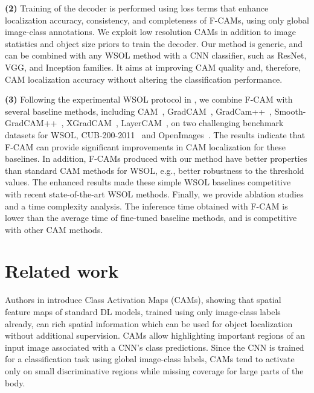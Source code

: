 \documentclass[twocolumn]{article}
\theoremstyle{definition}
\begin{document}
\noindent \textbf{(2)} Training of the decoder is performed using loss terms that enhance localization accuracy, consistency, and completeness of F-CAMs, using only global image-class annotations. We exploit low resolution CAMs in addition to image statistics and object size priors to  train the decoder. Our method is generic, and can be combined with any WSOL method with a CNN classifier, such as ResNet, VGG, and Inception families. It aims at improving CAM quality and, therefore, CAM localization accuracy without altering the classification performance.

\noindent \textbf{(3)} Following the experimental WSOL protocol in \cite{choe2020evaluating}, we combine F-CAM with several baseline methods, including CAM~\cite{zhou2016learning}, GradCAM~\cite{SelvarajuCDVPB17iccvgradcam}, GradCam++~\cite{ChattopadhyaySH18wacvgradcampp}, Smooth-GradCAM++~\cite{omeiza2019corr}, XGradCAM~\cite{fu2020axiom}, LayerCAM~\cite{JiangZHCW21layercam}, on two challenging benchmark datasets for WSOL, CUB-200-2011~\cite{WahCUB2002011} and OpenImages~\cite{BenensonPF19,choe2020evaluating}.  The results indicate that F-CAM can provide significant improvements in CAM localization for these baselines. In addition, F-CAMs produced with our method have better properties than standard CAM methods for WSOL, e.g., better robustness to the threshold values. The enhanced results made these simple WSOL baselines competitive with recent state-of-the-art WSOL methods. Finally, we provide ablation studies and a time complexity analysis. The inference time obtained with F-CAM is lower than the average time of fine-tuned baseline methods, and is competitive with other CAM methods.



\section{Related work}
\label{sec:proposal}



Authors in \cite{zhou2016learning} introduce Class Activation Maps (CAMs), showing that spatial feature maps of standard DL models, trained using only image-class labels already, can rich spatial information which can be used for object localization without additional supervision. CAMs allow highlighting important regions of an input image associated with a CNN’s class predictions. Since the CNN is trained for a  classification task using global image-class labels, CAMs tend to activate only on small discriminative regions while missing coverage for large parts of the body.
\end{document}
